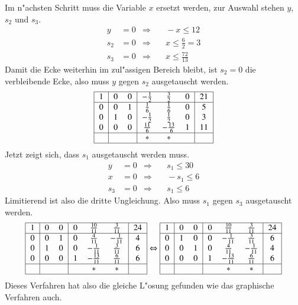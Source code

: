 Im n"achsten Schritt muss die Variable $x$ ersetzt werden, zur 
Auswahl stehen $y$, $s_2$ und $s_3$.
\begin{align*}
  y&=0&\Rightarrow&\quad -x\le 12
\\
s_2&=0&\Rightarrow&\quad x\le \frac{6}{2} = 3
\\
s_3&=0&\Rightarrow&\quad x\le \frac{72}{13}
\end{align*}
Damit die Ecke weiterhin im zul"assigen Bereich bleibt, ist $s_2=0$
die verbleibende Ecke, also muss $y$ gegen $s_2$ ausgetauscht werden.
\[
\begin{tabular}{|>{$}c<{$}|>{$}c<{$}>{$}c<{$}|>{$}c<{$}>{$}c<{$}>{$}c<{$}|>{$}c<{$}|}
\hline
1&         0& 0&   -\frac12&    \frac32&      0& 21\\
\hline
0&         0& 1&    \frac16&    \frac16&      0&  5\\
0&         1& 0&   -\frac12&    \frac12&      0&  3\\
0&         0& 0& \frac{11}6&-\frac{13}6&      1& 11\\
\hline
 &  &  & *& *&  &  \\
\hline
\end{tabular}
\]
Jetzt zeigt sich, dass $s_1$ ausgetauscht werden muss. 
\begin{align*}
  y&=0&\Rightarrow&\quad s_1\le 30
\\
  x&=0&\Rightarrow&\quad -s_1\le 6
\\
s_3&=0&\Rightarrow&\quad s_1\le 6
\end{align*}
Limitierend ist also die dritte Ungleichung. Also muss $s_1$ gegen
$s_3$ ausgetauscht werden.
\[
\begin{tabular}{|>{$}c<{$}|>{$}c<{$}>{$}c<{$}|>{$}c<{$}>{$}c<{$}>{$}c<{$}|>{$}c<{$}|}
\hline
1&         0& 0&          0& \frac{10}{11}& \frac{3}{11}& 24\\
\hline
0&         0& 1&          0&  \frac{4}{11}&-\frac{1}{11}&  4\\
0&         1& 0&          0& -\frac{1}{11}& \frac{3}{11}&  6\\
0&         0& 0&          1&-\frac{13}{11}& \frac{6}{11}&  6\\
\hline
 &          &  &           &             *&            *&  \\
\hline
\end{tabular}
\Leftrightarrow
\begin{tabular}{|>{$}c<{$}|>{$}c<{$}>{$}c<{$}|>{$}c<{$}>{$}c<{$}>{$}c<{$}|>{$}c<{$}|}
\hline
1&         0& 0&          0& \frac{10}{11}& \frac{3}{11}& 24\\
\hline
0&         1& 0&          0& -\frac{1}{11}& \frac{3}{11}&  6\\
0&         0& 1&          0&  \frac{4}{11}&-\frac{1}{11}&  4\\
0&         0& 0&          1&-\frac{13}{11}& \frac{6}{11}&  6\\
\hline
 &          &  &           &             *&            *&  \\
\hline
\end{tabular}
\]
Dieses Verfahren hat also die gleiche L"osung gefunden wie das
graphische Verfahren auch.

